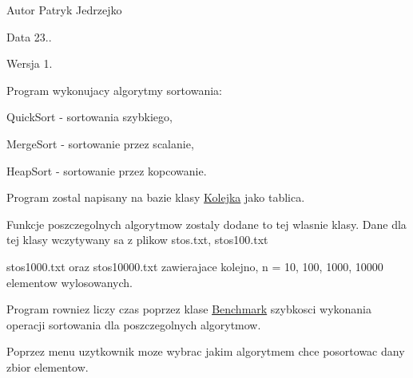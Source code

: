 \begin{DoxyAuthor}{\-Autor}
\-Patryk \-Jedrzejko 
\end{DoxyAuthor}
\begin{DoxyDate}{\-Data}
23.. 
\end{DoxyDate}
\begin{DoxyVersion}{\-Wersja}
1.
\end{DoxyVersion}
\-Program wykonujacy algorytmy sortowania\-: \par
 \-Quick\-Sort -\/ sortowania szybkiego, \par
 \-Merge\-Sort -\/ sortowanie przez scalanie, \par
 \-Heap\-Sort -\/ sortowanie przez kopcowanie. \par
 \-Program zostal napisany na bazie klasy \hyperlink{class_kolejka}{\-Kolejka} jako tablica. \par
 \-Funkcje poszczegolnych algorytmow zostaly dodane to tej wlasnie klasy. \-Dane dla tej klasy wczytywany sa z plikow stos.\-txt, stos100.\-txt \par
 stos1000.\-txt oraz stos10000.\-txt zawierajace kolejno, n = 10, 100, 1000, 10000 elementow wylosowanych. \par
 \-Program rowniez liczy czas poprzez klase \hyperlink{class_benchmark}{\-Benchmark} szybkosci wykonania operacji sortowania dla poszczegolnych algorytmow. \par
 \-Poprzez menu uzytkownik moze wybrac jakim algorytmem chce posortowac dany zbior elementow. 